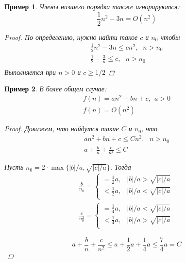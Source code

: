 \documentclass[12pt,a4paper]{report}
\providecommand{\abs}[1]{\left\lvert{#1}\right\rvert}
\newtheorem*{example}{Пример}
\begin{document}

\begin{example}
Члены низшего порядка также игнорируются:
$$
\frac{1}{2}n^2 - 3n = O(n^2)
$$
\begin{proof}По определению, нужно найти такое $c$ и $n_0$ чтобы
$$
\begin{gathered}
\frac{1}{2}n^2 - 3n \leqslant c n^2,~~~ n>n_0\\
\frac{1}{2} - \frac{3}{n} \leqslant c,~~~ n>n_0\\
\end{gathered}
$$
Выполняется при $n>0$ и $c \geqslant 1/2$
\end{proof}
\end{example}


\begin{example}
В более общем случае:
$$
  \begin{gathered}
  f(n) = an^2 + bn + c,~~ a > 0\\
  f(n)=O(n^2)
  \end{gathered}
$$

\begin{proof}
Докажем, что найдутся такие $C$ и $n_0$, что
$$
  \begin{gathered}
  an^2 + bn + c \leqslant C n^2,~~~n>n_0\\
  a + \frac{b}{n}  + \frac{c}{n^2} \leqslant C
  \end{gathered}
$$

Пусть $n_0 = 2 \cdot \max\{\abs{b}/a, \sqrt{\abs{c}/a}\}$. Тогда
$$
  \begin{gathered}
    \frac{b}{n_0} = \begin{cases}
    = \frac{1}{2} a, & \abs{b}/a > \sqrt{\abs{c}/a}\ \\
    < \frac{1}{2} a, & \abs{b}/a < \sqrt{\abs{c}/a}\ \\
    \end{cases} \\
    \frac{c}{n^2_0} = \begin{cases}
    = \frac{1}{4} a, & \abs{b}/a < \sqrt{\abs{c}/a}\ \\
    < \frac{1}{4} a, & \abs{b}/a > \sqrt{\abs{c}/a}\ \\
    \end{cases}
  \end{gathered}
$$

$$
a + \frac{b}{n}  + \frac{c}{n^2}  \leqslant a + \frac{1}{2} a + \frac{1}{4} a \leqslant \boxed{\frac{7}{4} a = C}
$$
\end{proof}
\end{example}
\end{document}
